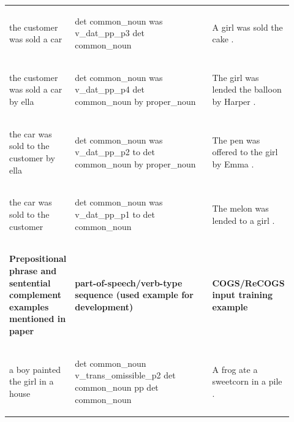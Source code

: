 \documentclass[11pt]{article}
\begin{document}
\begin{table}
\begin{tabular}{p{0.2\linewidth} p{0.52\linewidth} p{0.2\linewidth}}
\begin{small}the customer was sold a car\end{small} & \begin{small}det common\_noun was v\_dat\_pp\_p3 det common\_noun \end{small} & \begin{small}A girl was sold the cake .\end{small} \\
\begin{small}the customer was sold a car by ella\end{small} & \begin{small}det common\_noun was v\_dat\_pp\_p4 det common\_noun by proper\_noun \end{small} & \begin{small}The girl was lended the balloon by Harper .\end{small} \\
\begin{small}the car was sold to the customer by ella\end{small} & \begin{small}det common\_noun was v\_dat\_pp\_p2 to det common\_noun by proper\_noun \end{small} & \begin{small}The pen was offered to the girl by Emma .\end{small} \\
\begin{small}the car was sold to the customer\end{small} & \begin{small}det common\_noun was v\_dat\_pp\_p1 to det common\_noun \end{small} & \begin{small}The melon was lended to a girl .\end{small} \\
\hline
\begin{small}\textbf{Prepositional phrase and sentential complement examples mentioned in paper}\end{small} & \begin{small}\textbf{part-of-speech/verb-type sequence (used example for development)}\end{small} & \begin{small}\textbf{COGS/ReCOGS input training example}\end{small} \\
\hline
\begin{small}a boy painted the girl in a house\end{small} & \begin{small}det common\_noun v\_trans\_omissible\_p2 det common\_noun pp det common\_noun\end{small} & \begin{small}A frog ate a sweetcorn in a pile .\end{small} \\

\end{tabular}
\end{table}
\end{document}
